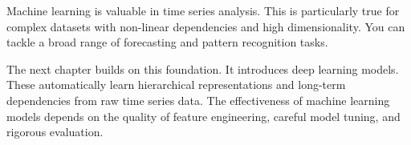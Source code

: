 Machine learning is valuable in time series analysis. This is particularly true for complex datasets with non-linear dependencies and high dimensionality. You can tackle a broad range of forecasting and pattern recognition tasks.

The next chapter builds on this foundation. It introduces deep learning models. These automatically learn hierarchical representations and long-term dependencies from raw time series data. The effectiveness of machine learning models depends on the quality of feature engineering, careful model tuning, and rigorous evaluation.


